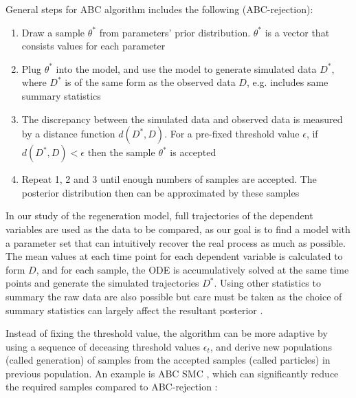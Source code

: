 General steps for ABC algorithm includes the following (ABC-rejection):

\begin{enumerate}
    \item Draw a sample $\theta^*$ from parameters' prior distribution. $\theta^*$ is a vector that consists values for each parameter
    \item Plug $\theta^*$ into the model, and use the model to generate simulated data $D^*$, where $D^*$ is of the same form as the observed data $D$, e.g. includes same summary statistics
    \item The discrepancy between the simulated data and observed data is measured by a distance function $d(D^*, D)$. For a pre-fixed threshold value $\epsilon$, if $d(D^*, D)<\epsilon$ then the sample $\theta^*$ is accepted
    \item Repeat 1, 2 and 3 until enough numbers of samples are accepted. The posterior distribution then can be approximated by these samples
\end{enumerate}

In our study of the regeneration model, full trajectories of the dependent variables are used as the data to be compared, as our goal is to find a model with a parameter set that can intuitively recover the real process as much as possible. The mean values at each time point for each dependent variable is calculated to form $D$, and for each sample, the ODE is accumulatively solved at the same time points and generate the simulated trajectories $D^*$. Using other statistics to summary the raw data are also possible but care must be taken as the choice of summary statistics can largely affect the resultant posterior \cite{summaryD, summaryD2}.

Instead of fixing the threshold value, the algorithm can be more adaptive by using a sequence of deceasing threshold values $\epsilon_t$, and derive new populations (called generation) of samples from the accepted samples (called particles) in previous population. An example is ABC SMC \cite{Toni}, which can significantly reduce the required samples compared to ABC-rejection \cite{ref:disease}:

